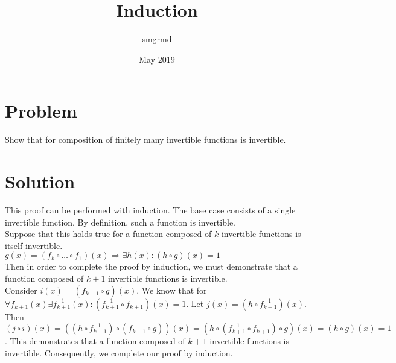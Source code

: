 \documentclass{article}
\title{Induction}
\author{smgrmd }
\date{May 2019}
\begin{document}
\section{Problem}
Show that for composition of finitely many invertible functions is invertible.

\section{Solution}
This proof can be performed with induction.
The base case consists of a single invertible function.
By definition, such a function is invertible. \\

Suppose that this holds true for a function composed of $k$ invertible functions is itself invertible. \\
$g(x) = (f_k \circ \ldots \circ f_1)(x) \Rightarrow \exists h(x) : (h \circ g)(x) = 1$ \\
Then in order to complete the proof by induction, we must demonstrate that a function composed of $k+1$ invertible functions is invertible. \\

Consider $i(x) = (f_{k+1} \circ g)(x)$.
We know that for $\forall f_{k+1}(x) \exists f_{k+1}^{-1}(x): (f_{k+1}^{-1} \circ f_{k+1})(x) = 1$.
Let $j(x) = (h \circ f_{k+1}^{-1})(x)$.
Then $(j \circ i)(x) = ((h \circ f_{k+1}^{-1}) \circ (f_{k+1} \circ g))(x) = (h \circ (f_{k+1}^{-1} \circ f_{k+1}) \circ g)(x) = (h \circ g)(x) = 1$.
This demonstrates that a function composed of $k+1$ invertible functions is invertible.
Consequently, we complete our proof by induction.
\end{document}
